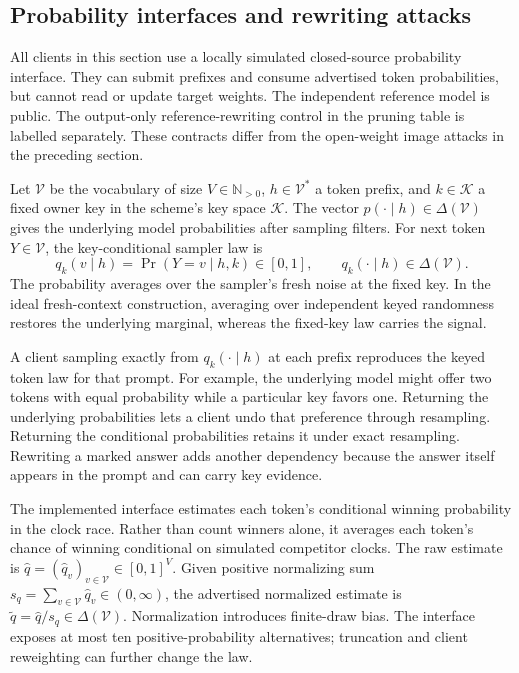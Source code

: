 \subsection{Probability interfaces and rewriting attacks}
\label{app:exposure}
All clients in this section use a locally simulated closed-source probability interface. They can submit prefixes and consume advertised token probabilities, but cannot read or update target weights. The independent reference model is public. The output-only reference-rewriting control in the pruning table is labelled separately. These contracts differ from the open-weight image attacks in the preceding section.

Let $\mathcal V$ be the vocabulary of size $V\in\mathbb N_{>0}$, $h\in\mathcal V^*$ a token prefix, and $k\in\mathcal K$ a fixed owner key in the scheme's key space $\mathcal K$. The vector $p(\cdot\mid h)\in\Delta(\mathcal V)$ gives the underlying model probabilities after sampling filters. For next token $Y\in\mathcal V$, the key-conditional sampler law is
\begin{equation}
\label{eq:key-conditional-token-law}
 q_k(v\mid h)=\Pr(Y=v\mid h,k)\in[0,1],
 \qquad q_k(\cdot\mid h)\in\Delta(\mathcal V).
\end{equation}
The probability averages over the sampler's fresh noise at the fixed key. In the ideal fresh-context construction, averaging over independent keyed randomness restores the underlying marginal, whereas the fixed-key law carries the signal.

A client sampling exactly from $q_k(\cdot\mid h)$ at each prefix reproduces the keyed token law for that prompt. For example, the underlying model might offer two tokens with equal probability while a particular key favors one. Returning the underlying probabilities lets a client undo that preference through resampling. Returning the conditional probabilities retains it under exact resampling. Rewriting a marked answer adds another dependency because the answer itself appears in the prompt and can carry key evidence.

The implemented interface estimates each token's conditional winning probability in the clock race. Rather than count winners alone, it averages each token's chance of winning conditional on simulated competitor clocks. The raw estimate is $\widehat q=(\widehat q_v)_{v\in\mathcal V}\in[0,1]^V$. Given positive normalizing sum $s_q=\sum_{v\in\mathcal V}\widehat q_v\in(0,\infty)$, the advertised normalized estimate is $\widetilde q=\widehat q/s_q\in\Delta(\mathcal V)$. Normalization introduces finite-draw bias. The interface exposes at most ten positive-probability alternatives; truncation and client reweighting can further change the law.

